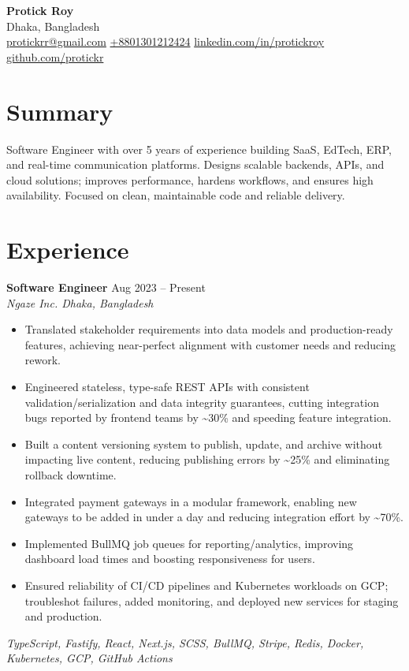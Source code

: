 \documentclass[a4paper,10pt]{article}
\begin{document}
{\LARGE \textbf{Protick Roy}}\\[-1pt]
Dhaka, Bangladesh \\
\href{mailto:protickrr@gmail.com}{protickrr@gmail.com} \textbar{} \href{tel:+8801301212424}{+8801301212424} \textbar{} 
\href{https://www.linkedin.com/in/protickroy}{linkedin.com/in/protickroy} \textbar{} 
\href{https://github.com/protickr}{github.com/protickr}

\vspace{3pt}

\section*{Summary}
Software Engineer with over 5 years of experience building SaaS, EdTech, ERP, and real-time communication platforms. Designs scalable backends, APIs, and cloud solutions; improves performance, hardens workflows, and ensures high availability. Focused on clean, maintainable code and reliable delivery.

\vspace{3pt}

\section*{Experience}

\textbf{Software Engineer} \hfill Aug 2023 -- Present\\[-2pt]
\textit{Ngaze Inc. \textbar{} Dhaka, Bangladesh}\\[-4pt]
\begin{itemize}
  \item Translated stakeholder requirements into data models and production-ready features, achieving near-perfect alignment with customer needs and reducing rework.
  \item Engineered stateless, type-safe REST APIs with consistent validation/serialization and data integrity guarantees, cutting integration bugs reported by frontend teams by \textasciitilde{}30\% and speeding feature integration.
  \item Built a content versioning system to publish, update, and archive without impacting live content, reducing publishing errors by \textasciitilde{}25\% and eliminating rollback downtime.
  \item Integrated payment gateways in a modular framework, enabling new gateways to be added in under a day and reducing integration effort by \textasciitilde{}70\%.
  \item Implemented BullMQ job queues for reporting/analytics, improving dashboard load times and boosting responsiveness for users.
  \item Ensured reliability of CI/CD pipelines and Kubernetes workloads on GCP; troubleshot failures, added monitoring, and deployed new services for staging and production.
\end{itemize}
\emph{TypeScript, Fastify, React, Next.js, SCSS, BullMQ, Stripe, Redis, Docker, Kubernetes, GCP, GitHub Actions}
\end{document}
